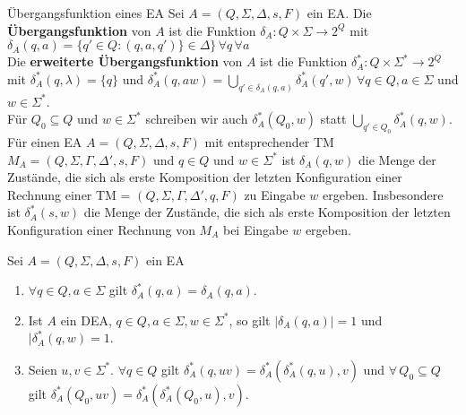 \begin{defn}{Übergangsfunktion eines EA}
    Sei $A=(Q, \Sigma, \Delta, s,F)$ ein EA. Die \textbf{Übergangsfunktion} von $A$ ist die Funktion
    $\delta_A : Q \times \Sigma \rightarrow 2^Q$ mit $\delta_A(q,a) = \{q' \in Q : (q,a,q') \} \in \Delta \} \, \forall q \, \forall a$ \\

    Die \textbf{erweiterte Übergangsfunktion} von $A$ ist die Funktion $\delta_A^* : Q \times \Sigma^* \rightarrow 2^Q$\\
    mit $\delta^*_A(q,\lambda) = \{q\}$ und $\delta_A^*(q,aw)= \bigcup\limits_{q' \in \delta_A(q,a)} \delta_A^* (q',w) \, \forall q \in Q, a \in \Sigma$ 
    und $w \in \Sigma^*$. \\

    Für $Q_0 \subseteq Q$ und $w \in \Sigma^*$ schreiben wir auch $\delta_A^*(Q_0,w)$ statt $\bigcup\limits_{q' \in Q_0} \delta_A^*(q,w)$. \\

    Für einen EA $A = (Q,\Sigma, \Delta, s, F)$ mit entsprechender TM $M_A = (Q, \Sigma, \Gamma, \Delta',s,F)$ und $q \in Q$ und $w \in \Sigma^*$ ist
    $\delta_A(q,w)$ die Menge der Zustände, die sich als erste Komposition der letzten Konfiguration einer Rechnung einer TM = $(Q, \Sigma, \Gamma, \Delta',q,F)$ zu Eingabe $w$
    ergeben. Insbesondere ist $\delta_A^*(s,w)$ die Menge der Zustände, die sich als erste Komposition der letzten Konfiguration einer Rechnung von $M_A$ bei 
    Eingabe $w$ ergeben.
\end{defn}

\begin{bem}
    Sei $A = (Q, \Sigma, \Delta, s, F)$ ein EA
    \begin{enumerate}
        \item $\forall q \in Q, a \in \Sigma$ gilt $\delta^*_A(q,a) = \delta_A(q,a)$.
        \item Ist $A$ ein DEA, $q \in Q, a \in \Sigma, w \in \Sigma^*$, so gilt  $|\delta_A(q,a)| = 1$ und $|\delta^*_A(q,w) =1$.
        \item Seien $u,v \in \Sigma^*$. $\forall q \in Q$ gilt $\delta^*_A(q,uv)=\delta^*_A(\delta^*_A(q,u),v)$ 
              und $\forall \, Q_0 \subseteq Q$ gilt $\delta^*_A(Q_0,uv) = \delta^*_A(\delta^*_A(Q_0,u),v)$.
    \end{enumerate}
\end{bem}

